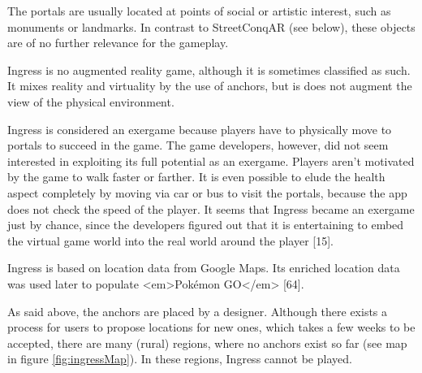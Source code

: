 The portals are usually located at points of social or artistic interest, such as monuments or landmarks. In contrast to StreetConqAR (see below), these objects are of no further relevance for the gameplay.

Ingress is no augmented reality game, although it is sometimes classified as such. It mixes reality and virtuality by the use of anchors, but is does not augment the view of the physical environment.

Ingress is considered an exergame because players have to physically move to portals to succeed in the game. The game developers, however, did not seem interested in exploiting its full potential as an exergame. Players aren’t motivated by the game to walk faster or farther. It is even possible to elude the health aspect completely by moving via car or bus to visit the portals, because the app does not check the speed of the player. It seems that Ingress became an exergame just by chance, since the developers figured out that it is entertaining to embed the virtual game world into the real world around the player [15].

Ingress is based on location data from Google Maps. Its enriched location data was used later to populate <em>Pokémon GO</em> [64].

As said above, the anchors are placed by a designer. Although there exists a process for users to propose locations for new ones, which takes a few weeks to be accepted, there are many (rural) regions, where no anchors exist so far (see map in figure \ref{fig:ingressMap}). In these regions, Ingress cannot be played.

